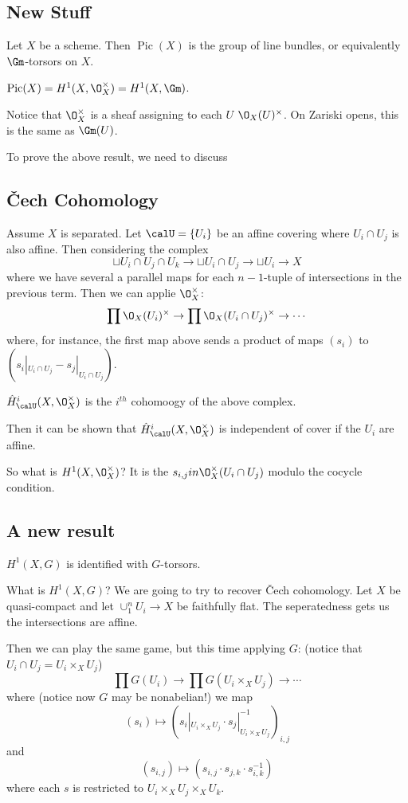 \documentclass[12pt]{article}
\begin{document}
\subsection{New Stuff}
Let $X$ be a scheme. Then $\operatorname{Pic}(X)$ is the group of line bundles, or equivalently $\Gm$-torsors on $X$.
\begin{thm}
	$\operatorname{Pic}(X)=H^1(X,\O_X^\times)=H^1(X,\Gm)$.
\end{thm}
Notice that $\O_X^\times$ is a sheaf assigning to each $U$ $\O_X(U)^\times$. On Zariski opens, this is the same as $\Gm(U)$.

To prove the above result, we need to discuss 
\subsection{\texorpdfstring{\v C}{C}ech Cohomology}
Assume $X$ is separated. Let $\calU=\{U_i\}$ be an affine covering where $U_i\cap U_j$ is also affine. Then considering the complex 
\[\sqcup U_i\cap U_j\cap U_k\to \sqcup U_i\cap U_j\to \sqcup U_i\to X\]
where we have several a parallel maps for each $n-1$-tuple of intersections in the previous term. Then we can applie $\O_X^\times$:
\[\prod \O_X(U_i)^\times\to \prod\O_X(U_i\cap U_j)^\times\to\cdots\]
where, for instance, the first map above sends a product of maps $(s_i)$ to $(s_i|_{U_i\cap U_j}-s_j|_{U_i\cap U_j})$.

\begin{defn}
	$\hat H_\calU^i(X,\O_X^\times)$ is the $i^{th}$ cohomoogy of the above complex.
\end{defn}
Then it can be shown that $\hat H_\calU^i(X,\O_X^\times)$ is independent of cover if the $U_i$ are affine.

So what is $H^1(X,\O_X^\times)$? It is the $s_{i,j}in\O_X^\times(U_i\cap U_j)$ modulo the cocycle condition.

\subsection{A new result}
\begin{thm}
	$H^1(X,G)$ is identified with $G$-torsors.
\end{thm}
What is $H^1(X,G)$? We are going to try to recover \v Cech cohomology. Let $X$ be quasi-compact and let $\cup_1^n U_i\to X$ be 
faithfully flat. The seperatedness gets us the intersections are affine.

Then we can play the same game, but this time applying $G$: (notice that $U_i\cap U_j=U_i\times_X U_j$)
\[\prod G(U_i)\to \prod G(U_i\times_X U_j)\to\cdots\]
where (notice now $G$ may be nonabelian!) we map 
\[(s_i)\mapsto (s_i|_{U_i\times_X U_j}\cdot s_j|_{U_i\times_X U_j}^{-1})_{i,j}\]
and 
\[(s_{i,j})\mapsto (s_{i,j}\cdot s_{j,k}\cdot s_{i,k}^{-1})\]
where each $s$ is restricted to $U_i\times_XU_j\times_X U_k$.
\end{document}
